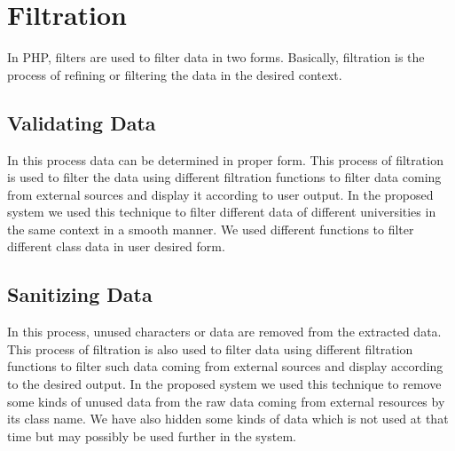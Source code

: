 \section{Filtration}

In PHP, filters are used to filter data in two forms. Basically, filtration is the process of refining or filtering the data in the desired context.

\subsection{Validating Data}

In this process data can be determined in proper form. This process of filtration is used to filter the data using different filtration functions to filter data coming from external sources and display it according to user output. In the proposed system we used this technique to filter different data of different universities in the same context in a smooth manner. We used different functions to filter different class data in user desired form.

\subsection{Sanitizing Data}

In this process, unused characters or data are removed from the extracted data. This process of filtration is also used to filter data using different filtration functions to filter such data coming from external sources and display according to the desired output. In the proposed system we used this technique to remove some kinds of unused data from the raw data coming from external resources by its class name. We have also hidden some kinds of data which is not used at that time but may possibly be used further in the system.
